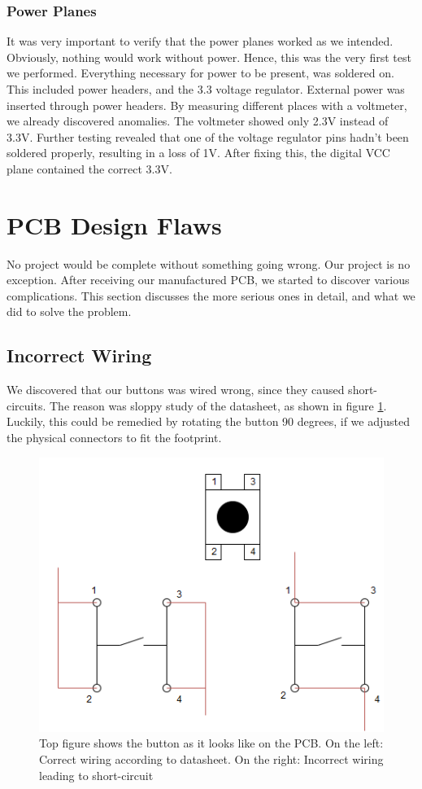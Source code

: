 \subsubsection{Power Planes}
It was very important to verify that the power planes worked as we intended. Obviously, nothing would work without power. Hence, this was the very first test we performed.
\newline
Everything necessary for power to be present, was soldered on. This included power headers, and the 3.3 voltage regulator. External power was inserted through power headers. By measuring different places with a voltmeter, we already discovered anomalies. The voltmeter showed only 2.3V instead of 3.3V. Further testing revealed that one of the voltage regulator pins hadn't been soldered properly, resulting in a loss of 1V. After fixing this, the digital VCC plane contained the correct 3.3V.


\section{PCB Design Flaws}
No project would be complete without something going wrong. Our project is no exception. After receiving our manufactured PCB, we started to discover various complications. This section discusses the more serious ones in detail, and what we did to solve the problem.

\subsection{Incorrect Wiring}
We discovered that our buttons was wired wrong, since they caused short-circuits. The reason was sloppy study of the datasheet, as shown in figure \ref{fig:Button Issue}. Luckily, this could be remedied by rotating the button 90 degrees, if we adjusted the physical connectors to fit the footprint.

\begin{figure}[h!]
\centering
\includegraphics[scale=0.5]{images/Button_Issue.png}
\caption{Top figure shows the button as it looks like on the PCB. On the left: Correct wiring according to datasheet. On the right: Incorrect wiring leading to short-circuit}
\label{fig:Button Issue}
\end{figure}


